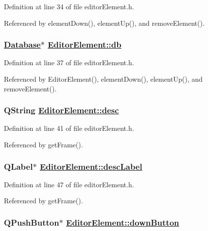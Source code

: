 Definition at line 34 of file editor\-Element.h.

Referenced by element\-Down(), element\-Up(), and remove\-Element().\hypertarget{classEditorElement_r2}{
\subsubsection[db]{\setlength{\rightskip}{0pt plus 5cm}\hyperlink{classDatabase}{Database}$\ast$ \hyperlink{classEditorElement_r2}{Editor\-Element::db}}}
\label{classEditorElement_r2}


Definition at line 37 of file editor\-Element.h.

Referenced by Editor\-Element(), element\-Down(), element\-Up(), and remove\-Element().\hypertarget{classEditorElement_r5}{
\subsubsection[desc]{\setlength{\rightskip}{0pt plus 5cm}QString \hyperlink{classEditorElement_r5}{Editor\-Element::desc}}}
\label{classEditorElement_r5}


Definition at line 41 of file editor\-Element.h.

Referenced by get\-Frame().\hypertarget{classEditorElement_r10}{
\subsubsection[descLabel]{\setlength{\rightskip}{0pt plus 5cm}QLabel$\ast$ \hyperlink{classEditorElement_r10}{Editor\-Element::desc\-Label}}}
\label{classEditorElement_r10}


Definition at line 47 of file editor\-Element.h.

Referenced by get\-Frame().\hypertarget{classEditorElement_r13}{
\subsubsection[downButton]{\setlength{\rightskip}{0pt plus 5cm}QPush\-Button$\ast$ \hyperlink{classEditorElement_r13}{Editor\-Element::down\-Button}}}
\label{classEditorElement_r13}


